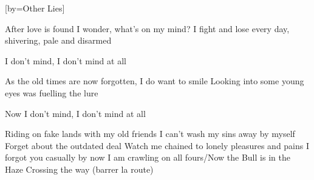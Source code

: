 [by={Other Lies}]

  \chordsoff
  \beginverse
  After love is found I wonder, what’s on my mind?
  I fight and lose every day, shivering, pale and disarmed

  \endverse

  
  \beginchorus
  I don’t mind, I don’t mind at all
  \endchorus

  \beginverse
  As the old times are now forgotten, I do want to smile
  Looking into some young eyes was fuelling the lure
  \endverse

  \beginchorus
  Now I don’t mind, I don’t mind at all
  \endchorus
  
  \beginverse
  Riding on fake lands with my old friends
  I can’t wash my sins away by myself
  Forget about the outdated deal 
  Watch me chained to lonely pleasures and pains 
  I forgot you casually by now 
  I am crawling on all fours/Now the Bull is in the Haze
  Crossing the way (barrer la route)
  \endverse
\endsong
